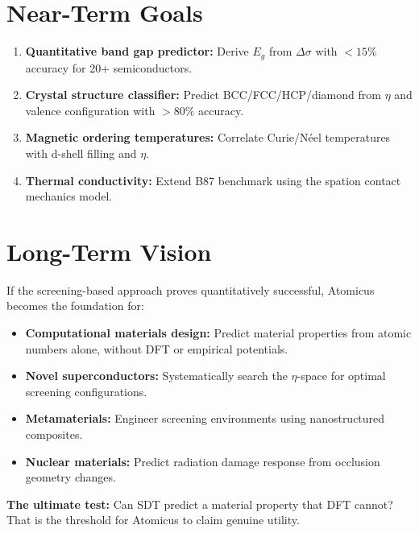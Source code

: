 \documentclass[12pt,a4paper]{report}
\begin{document}
\section{Near-Term Goals}

\begin{enumerate}
  \item \textbf{Quantitative band gap predictor:} Derive $E_g$ from $\Delta\sigma$ with $<15\%$ accuracy for 20+ semiconductors.
  \item \textbf{Crystal structure classifier:} Predict BCC/FCC/HCP/diamond from $\eta$ and valence configuration with $>80\%$ accuracy.
  \item \textbf{Magnetic ordering temperatures:} Correlate Curie/N\'eel temperatures with d-shell filling and $\eta$.
  \item \textbf{Thermal conductivity:} Extend B87 benchmark using the spation contact mechanics model.
\end{enumerate}

\section{Long-Term Vision}

If the screening-based approach proves quantitatively successful, Atomicus becomes the foundation for:
\begin{itemize}
  \item \textbf{Computational materials design:} Predict material properties from atomic numbers alone, without DFT or empirical potentials.
  \item \textbf{Novel superconductors:} Systematically search the $\eta$-space for optimal screening configurations.
  \item \textbf{Metamaterials:} Engineer screening environments using nanostructured composites.
  \item \textbf{Nuclear materials:} Predict radiation damage response from occlusion geometry changes.
\end{itemize}

\textbf{The ultimate test:} Can SDT predict a material property that DFT cannot?  That is the threshold for Atomicus to claim genuine utility.
\end{document}
